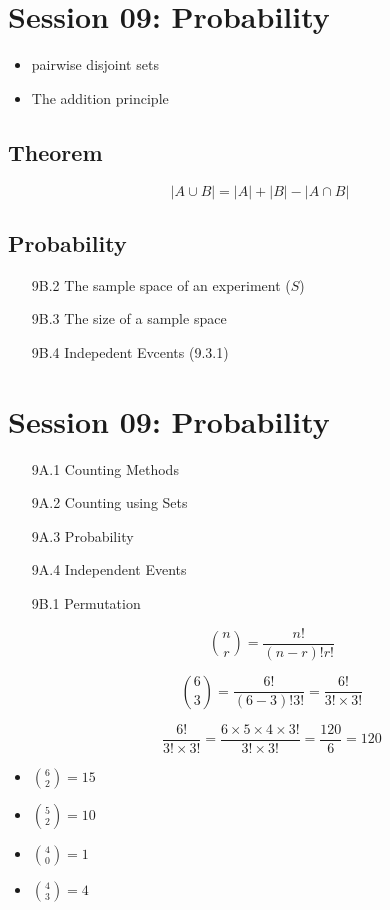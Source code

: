 \documentclass[12pt]{report}
\begin{document}
\section*{Session 09: Probability}

\begin{itemize}
	\item pairwise disjoint sets
	\item The addition principle
\end{itemize}
\subsection*{Theorem}
\[ |A \cup B| = |A| + |B| - |A \cap B|  \]


\subsection*{Probability}
\begin{itemize}
	\item[9B.2] The sample space of an experiment ($S$)
	\item[9B.3] The size of a sample space
	\item[9B.4] Indepedent Evcents (9.3.1)
\end{itemize}
\section*{Session 09: Probability}
\begin{itemize}
	\item[9A.1] Counting Methods
	\item[9A.2] Counting using Sets
	\item[9A.3] Probability
	\item[9A.4] Independent Events
\end{itemize}
\begin{itemize}
	\item[9B.1] Permutation
	
	\[ {n \choose r} = \frac{n!}{(n-r)! r!} \]
	
	
	\[ {6 \choose 3} = \frac{6!}{(6-3)! 3!} = \frac{6!}{3! \times 3!}\]
	
	
	\[ \frac{6!}{3! \times 3!} = \frac{6 \times 5 \times 4 \times 3!}{3! \times 3!} = \frac{120}{6} = 120\]
\end{itemize}

\begin{itemize}
	\item ${6 \choose 2} = 15$
	\item ${5 \choose 2} = 10$  
	\item ${4 \choose 0} = 1$  
	\item ${4 \choose 3} = 4$  
\end{itemize}
\end{document}
